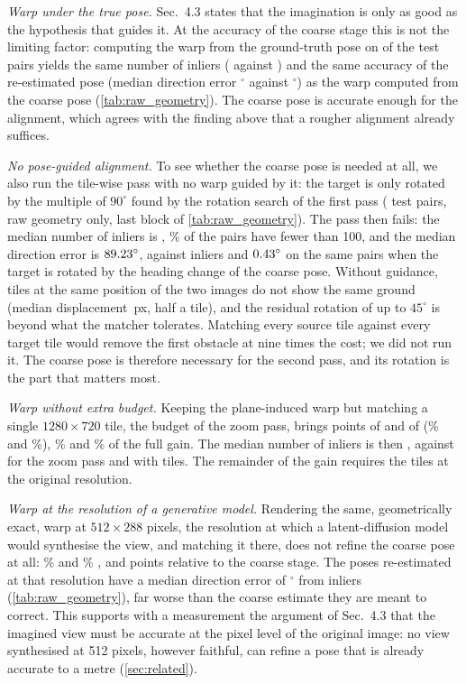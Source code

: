 \emph{Warp under the true pose.} Sec.~4.3 states that the imagination is only as good as the hypothesis that guides it. At the accuracy of the coarse stage this is not the limiting factor: computing the warp from the ground-truth pose on \rgOracleN{} of the test pairs yields the same number of inliers (\rgOracleInl{} against \rgOursSubInl) and the same accuracy of the re-estimated pose (median direction error \rgOracleDir$^\circ$ against \rgOursSubDir$^\circ$) as the warp computed from the coarse pose (\cref{tab:raw_geometry}). The coarse pose is accurate enough for the alignment, which agrees with the finding above that a rougher alignment already suffices.

\emph{No pose-guided alignment.} To see whether the coarse pose is needed at all, we also run the tile-wise pass with no warp guided by it: the target is only rotated by the multiple of $90^\circ$ found by the rotation search of the first pass (\rgNoAlignN{} test pairs, raw geometry only, last block of \cref{tab:raw_geometry}). The pass then fails: the median number of inliers is \rgNoAlignInl, \rgNoAlignLtHundred\% of the pairs have fewer than 100, and the median direction error is $89.23^\circ$, against \rgRotSubInl{} inliers and $0.43^\circ$ on the same pairs when the target is rotated by the heading change of the coarse pose. Without guidance, tiles at the same position of the two images do not show the same ground (median displacement \rgNoAlignRes\,px, half a tile), and the residual rotation of up to $45^\circ$ is beyond what the matcher tolerates. Matching every source tile against every target tile would remove the first obstacle at nine times the cost; we did not run it. The coarse pose is therefore necessary for the second pass, and its rotation is the part that matters most.

\emph{Warp without extra budget.} Keeping the plane-induced warp but matching a single $1280{\times}720$ tile, the budget of the zoom pass, brings \ctOneTiledSRd{} points of \SRd{} and \ctOneTiledSRe{} of \SRe{} (\ctOneTileSRd\% and \ctOneTileSRe\%), \ie \ctOneTileShareD\% and \ctOneTileShareE\% of the full gain. The median number of inliers is then \rgOneTileInl, against \rgZoomInl{} for the zoom pass and \rgOursInl{} with tiles. The remainder of the gain requires the tiles at the original resolution.

\emph{Warp at the resolution of a generative model.} Rendering the same, geometrically exact, warp at $512{\times}288$ pixels, the resolution at which a latent-diffusion model would synthesise the view, and matching it there, does not refine the coarse pose at all: \ctLowResSRd\% \SRd{} and \ctLowResSRe\% \SRe, \ie \ctLowResdSRd{} and \ctLowResdSRe{} points relative to the coarse stage. The poses re-estimated at that resolution have a median direction error of \rgLowResDir$^\circ$ from \rgLowResInl{} inliers (\cref{tab:raw_geometry}), far worse than the coarse estimate they are meant to correct. This supports with a measurement the argument of Sec.~4.3 that the imagined view must be accurate at the pixel level of the original image: no view synthesised at 512 pixels, however faithful, can refine a pose that is already accurate to a metre (\cref{sec:related}).

